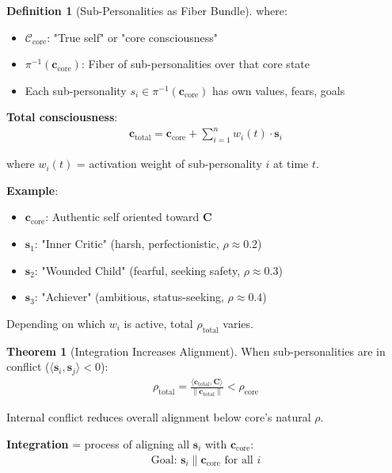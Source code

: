 \documentclass[11pt,a4paper]{article}
\theoremstyle{definition}
\newtheorem{definition}{Definition}[section]
\newtheorem{theorem}{Theorem}[section]
\theoremstyle{remark}
\newcommand{\CC}{\mathcal{C}}
\newcommand{\cc}{\mathbf{c}}
\begin{document}
\begin{enumerate}
\begin{definition}[Sub-Personalities as Fiber Bundle]
where:
\begin{itemize}
    \item \(\CC_{\text{core}}\): "True self" or "core consciousness"
    \item \(\pi^{-1}(\cc_{\text{core}})\): Fiber of sub-personalities over that core state
    \item Each sub-personality \(s_i \in \pi^{-1}(\cc_{\text{core}})\) has own values, fears, goals
\end{itemize}

\textbf{Total consciousness}:
\begin{align}
\cc_{\text{total}} = \cc_{\text{core}} + \sum_{i=1}^n w_i(t) \cdot \mathbf{s}_i
\end{align}

where \(w_i(t)\) = activation weight of sub-personality \(i\) at time \(t\).

\textbf{Example}:
\begin{itemize}
    \item \(\cc_{\text{core}}\): Authentic self oriented toward \(\mathbf{C}\)
    \item \(\mathbf{s}_1\): "Inner Critic" (harsh, perfectionistic, \(\rho \approx 0.2\))
    \item \(\mathbf{s}_2\): "Wounded Child" (fearful, seeking safety, \(\rho \approx 0.3\))
    \item \(\mathbf{s}_3\): "Achiever" (ambitious, status-seeking, \(\rho \approx 0.4\))
\end{itemize}

Depending on which \(w_i\) is active, total \(\rho_{\text{total}}\) varies.
\end{definition}

\begin{theorem}[Integration Increases Alignment]
When sub-personalities are in conflict (\(\langle \mathbf{s}_i, \mathbf{s}_j \rangle < 0\)):
\begin{align}
\rho_{\text{total}} = \frac{\langle \cc_{\text{total}}, \mathbf{C} \rangle}{\|\cc_{\text{total}}\|} < \rho_{\text{core}}
\end{align}

Internal conflict reduces overall alignment below core's natural \(\rho\).

\textbf{Integration} = process of aligning all \(\mathbf{s}_i\) with \(\cc_{\text{core}}\):
\begin{align}
\text{Goal: } \mathbf{s}_i \parallel \cc_{\text{core}} \text{ for all } i
\end{align}


\end{theorem}
\end{enumerate}
\end{document}
